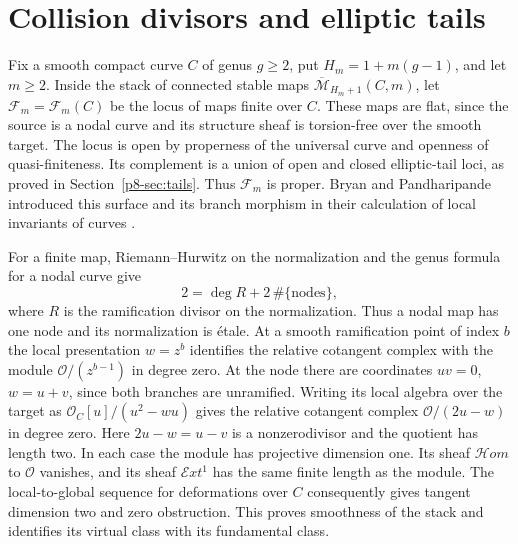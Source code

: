 \section{Collision divisors and elliptic tails}\label{p8-sec:hurwitz}

Fix a smooth compact curve \(C\) of genus \(g\ge 2\), put
\(H_m=1+m(g-1)\), and let \(m\ge 2\). Inside the stack of connected
stable maps \(\overline{\mathcal M}_{H_m+1}(C,m)\), let
\(\mathcal F_m=\mathcal F_m(C)\) be the locus of maps finite over \(C\).
These maps are flat, since the source is a nodal curve and its
structure sheaf is torsion-free over the smooth target. The locus is
open by properness of the universal curve and openness of
quasi-finiteness. Its complement is a union of open and closed
elliptic-tail loci, as proved in Section~\ref{p8-sec:tails}. Thus
\(\mathcal F_m\) is proper. Bryan and Pandharipande introduced this
surface and its branch morphism in their calculation of local
invariants of curves \cite[\S\S1.3.2, 4]{bp01}.

For a finite map, Riemann--Hurwitz on the normalization and the genus
formula for a nodal curve give
\[
           2=\deg R+2\,\#\{\text{nodes}\},
\]
where \(R\) is the ramification divisor on the normalization. Thus a
nodal map has one node and its normalization is \'etale. At a smooth
ramification point of index \(b\) the local presentation \(w=z^b\)
identifies the relative cotangent complex with the module
\(\mathcal O/(z^{b-1})\) in degree zero. At the node there are
coordinates \(uv=0\), \(w=u+v\), since both branches are unramified.
Writing its local algebra over the target as
\(\mathcal O_C[u]/(u^2-wu)\) gives the relative cotangent complex
\(\mathcal O/(2u-w)\) in degree zero. Here \(2u-w=u-v\) is a
nonzerodivisor and the quotient has length two. In each case the
module has projective dimension one. Its sheaf \(\mathcal{H}\!om\)
to \(\mathcal O\) vanishes, and its sheaf \(\mathcal{E}\!xt^1\) has the
same finite length as the module. The local-to-global sequence for
deformations over \(C\) consequently gives tangent dimension two and
zero obstruction. This proves smoothness of the stack and identifies
its virtual class with its fundamental class.


